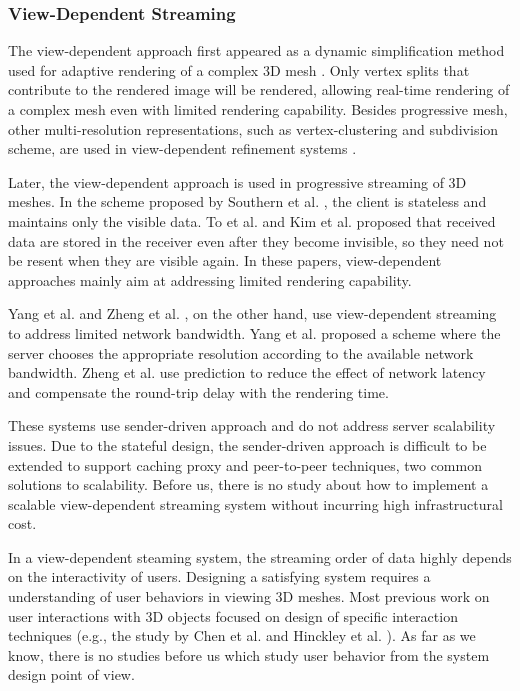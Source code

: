 \documentclass[11pt, a4paper]{report}
\begin{document}
    \subsubsection{View-Dependent Streaming}
    The view-dependent approach first appeared as 
    a dynamic simplification method used for adaptive rendering of a complex 3D mesh
    \cite{258843, 258847}. Only vertex splits that contribute to the rendered
    image will be rendered, allowing real-time rendering of a complex mesh
    even with limited rendering capability.
    Besides progressive mesh, other multi-resolution representations, 
    such as vertex-clustering  and subdivision scheme,
    are used in view-dependent refinement systems \cite{245627, efficient:Alliez,602344}.

    Later, the view-dependent approach is used in progressive 
	streaming of 3D meshes.     
    In the scheme proposed by Southern et al. \cite{363375},  the client is stateless and
    maintains only the visible data. 
    To et al. \cite{To1999}
    and Kim et al. \cite{kim:view} proposed that received data are stored
    in the receiver even after they become invisible, 
    so they need not be resent when they are visible again. 
    In these papers, view-dependent approaches mainly aim at addressing
    limited rendering capability. 
    
    Yang et al. \cite{progressive:Yang} and
    Zheng et al. \cite{zheng:interactive}, on the other hand, use
    view-dependent streaming to address limited network bandwidth.
    Yang et al. proposed a scheme where the server chooses the appropriate resolution
    according to the available network bandwidth.
    Zheng et al. \cite{zheng:interactive} use prediction to
    reduce the effect of network latency and 
    compensate the round-trip delay with the rendering time.
     
    These systems use sender-driven approach and do not address
    server scalability issues. Due to the stateful design, 
    the sender-driven approach is difficult to be extended to
    support caching proxy and peer-to-peer techniques, two 
    common solutions to scalability. Before us, there is no study about
    how to implement a scalable 
    view-dependent streaming system without incurring high infrastructural cost.

    In a view-dependent steaming system, the streaming order of data highly
    depends on the interactivity of users. Designing a satisfying system
    requires a understanding of user behaviors in viewing 3D meshes.
    Most previous work on user interactions with 3D objects focused on design
    of specific interaction techniques (e.g., the study by Chen et al. \cite{chen88study}
    and Hinckley et al. \cite{hinckley97usability}). 
    As far as we know, there is no studies before us which study user behavior
    from the system design point of view.
    
\end{document}
